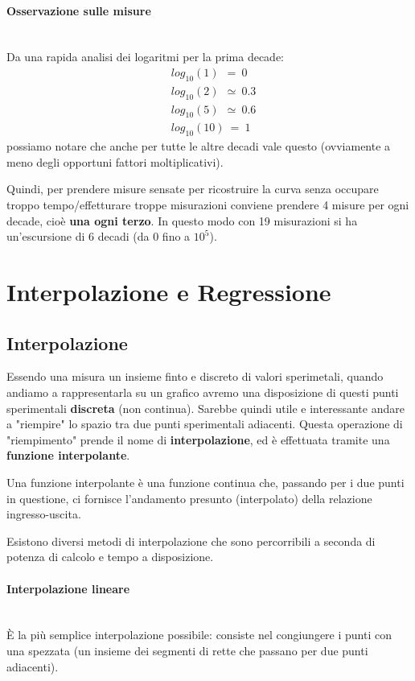 \documentclass[a4paper,11pt]{report}
\begin{document}
\paragraph{Osservazione sulle misure}~\\
Da una rapida analisi dei logaritmi per la prima decade:
\begin{align*}
&log_{10}(1)~~ = ~0\\
&log_{10}(2)~~ \simeq~ 0.3\\
&log_{10}(5)~~ \simeq~ 0.6\\
&log_{10}(10)~ =~ 1
\end{align*}
possiamo notare che anche per tutte le altre decadi vale questo (ovviamente a meno degli opportuni fattori moltiplicativi).

Quindi, per prendere misure sensate per ricostruire la curva senza occupare troppo tempo/effetturare troppe misurazioni conviene prendere 4 misure per ogni decade, cioè \textbf{una ogni terzo}. In questo modo con 19 misurazioni si ha un'escursione di 6 decadi (da 0 fino a $10^5$). 
\section{Interpolazione e Regressione}
\subsection{Interpolazione}
\label{interpolazione}
Essendo una misura un insieme finto e discreto di valori sperimetali, quando andiamo a rappresentarla su un grafico avremo una disposizione di questi punti sperimentali \textbf{discreta} (non continua). Sarebbe quindi utile e interessante andare a "riempire" lo spazio tra due punti sperimentali adiacenti. Questa operazione di "riempimento" prende il nome di \textbf{interpolazione}, ed è effettuata tramite una \textbf{funzione interpolante}.

Una funzione interpolante è una funzione continua che, passando per i due punti in questione, ci fornisce l'andamento presunto (interpolato) della relazione ingresso-uscita.

Esistono diversi metodi di interpolazione che sono percorribili a seconda di potenza di calcolo e tempo a disposizione.
\paragraph{Interpolazione lineare}~\\
È la più semplice interpolazione possibile: consiste nel congiungere i punti con una spezzata (un insieme dei segmenti di rette che passano per due punti adiacenti).
\end{document}
